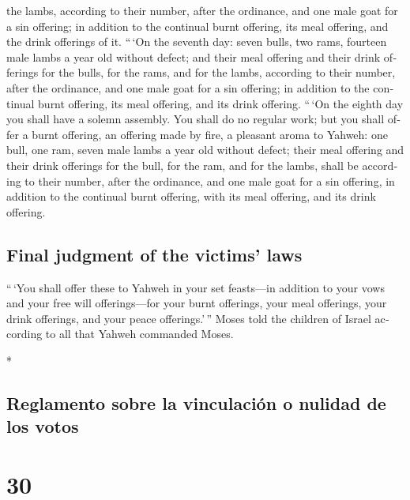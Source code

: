 \begin{paracol}{2}
\begin{otherlanguage}{english}
the lambs, according to their number, after the ordinance,
 and one male goat for a sin offering; in addition to the
continual burnt offering, its meal offering, and the drink offerings of
it.  ``\,`On the seventh day: seven bulls, two rams,
fourteen male lambs a year old without defect;  and their
meal offering and their drink offerings for the bulls, for the rams, and
for the lambs, according to their number, after the ordinance,
 and one male goat for a sin offering; in addition to the
continual burnt offering, its meal offering, and its drink offering.
 ``\,`On the eighth day you shall have a solemn assembly.
You shall do no regular work;  but you shall offer a
burnt offering, an offering made by fire, a pleasant aroma to Yahweh:
one bull, one ram, seven male lambs a year old without defect;
 their meal offering and their drink offerings for the
bull, for the ram, and for the lambs, shall be according to their
number, after the ordinance,  and one male goat for a sin
offering, in addition to the continual burnt offering, with its meal
offering, and its drink offering.

\hypertarget{final-judgment-of-the-victims-laws}{%
\subsection{Final judgment of the victims'
laws}\label{final-judgment-of-the-victims-laws}}

 ``\,`You shall offer these to Yahweh in your set
feasts---in addition to your vows and your free will offerings---for
your burnt offerings, your meal offerings, your drink offerings, and
your peace offerings.'\,''  Moses told the children of
Israel according to all that Yahweh commanded Moses.

\end{otherlanguage}

\switchcolumn[0]*

\hypertarget{reglamento-sobre-la-vinculaciuxf3n-o-nulidad-de-los-votos}{%
\subsection{Reglamento sobre la vinculación o nulidad de los
votos}\label{reglamento-sobre-la-vinculaciuxf3n-o-nulidad-de-los-votos}}

\hypertarget{section-58}{%
\section{30}\label{section-58}}


\end{paracol}
